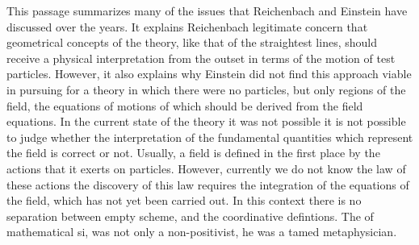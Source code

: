 \documentclass[draft]{article}
\begin{document}
%
This passage summarizes many of the issues that Reichenbach and Einstein have discussed over the years. It explains Reichenbach legitimate concern that geometrical concepts of the theory, like that of the straightest lines, should receive a physical interpretation from the outset in terms of the motion of test particles. However, it also explains why Einstein did not find this approach viable in pursuing for a theory in which there were no particles, but only regions of the field, the equations of motions of which should be derived from the field equations. In the current state of the theory it was not possible it is not possible to judge whether the interpretation of the fundamental quantities which represent the field is correct or not. Usually, a field is defined in the first place by the actions that it exerts on particles. However, currently we do not know the law of these actions the discovery of this law requires the integration of the equations of the field, which has not yet been carried out. In this context there is no separation between empty scheme, and the coordinative defintions. The of mathematical si, was not only a non-positivist, he was a tamed metaphysician. 



\printshorthands
\printbibliography
\end{document}
